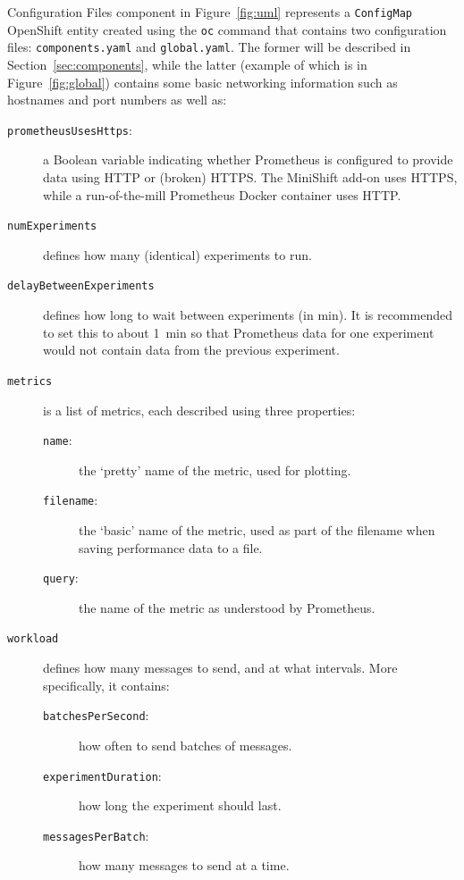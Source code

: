 \documentclass{article}
\begin{document}
Configuration Files component in Figure~\ref{fig:uml} represents a
\texttt{ConfigMap} OpenShift entity created using the \texttt{oc} command that
contains two configuration files: \texttt{components.yaml} and
\texttt{global.yaml}. The former will be described in
Section~\ref{sec:components}, while the latter (example of which is in
Figure~\ref{fig:global}) contains some basic networking information such as
hostnames and port numbers as well as:
\begin{description}
\item[\texttt{prometheusUsesHttps}:] a Boolean variable indicating whether
  Prometheus is configured to provide data using HTTP or (broken) HTTPS. The
  MiniShift add-on uses HTTPS, while a run-of-the-mill Prometheus Docker
  container uses HTTP.
\item[\texttt{numExperiments}] defines how many (identical) experiments to run.
\item[\texttt{delayBetweenExperiments}] defines how long to wait between
  experiments (in \si{\minute}). It is recommended to set this to about
  \SI{1}{\minute} so that Prometheus data for one experiment would not contain
  data from the previous experiment.
\item[\texttt{metrics}] is a list of metrics, each described using three
  properties:
  \begin{description}
  \item[\texttt{name}:] the `pretty' name of the metric, used for plotting.
  \item[\texttt{filename}:] the `basic' name of the metric, used as part of the
    filename when saving performance data to a file.
  \item[\texttt{query}:] the name of the metric as understood by Prometheus.
  \end{description}
\item[\texttt{workload}] defines how many messages to send, and at what
  intervals. More specifically, it contains:
  \begin{description}
  \item[\texttt{batchesPerSecond}:] how often to send batches of messages.
  \item[\texttt{experimentDuration}:] how long the experiment should
    last.
  \item[\texttt{messagesPerBatch}:] how many messages to send at a time.
  \end{description}
\end{description}
\end{document}
